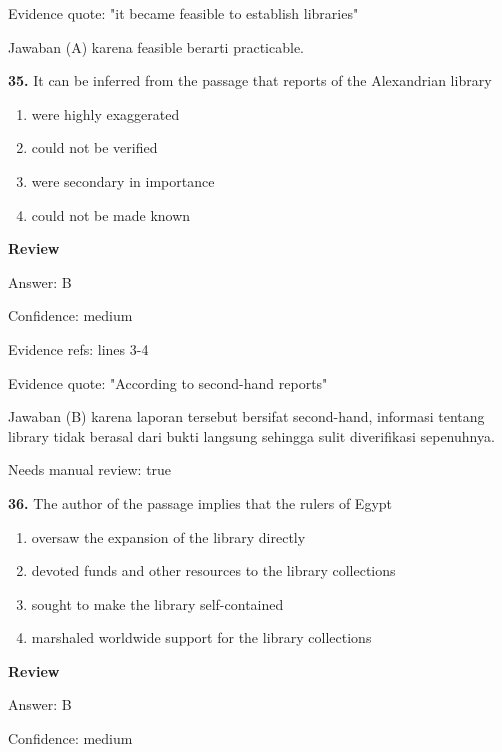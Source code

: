 \documentclass[12pt]{article}
\begin{document}
Evidence quote: "it became feasible to establish libraries"\par
Jawaban (A) karena feasible berarti practicable.\par
\endgroup
\par
\vspace{0.25\baselineskip}
\noindent\textbf{35.} It can be inferred from the passage that reports of the Alexandrian library
\begin{enumerate}[label=(\Alph*),leftmargin=*,itemsep=0.2em]
\item were highly exaggerated
\item could not be verified
\item were secondary in importance
\item could not be made known
\end{enumerate}
\par
\begingroup
\setlength{\parskip}{0pt}
\setlength{\parindent}{0pt}
\textbf{Review}\par
Answer: B\par
Confidence: medium\par
Evidence refs: lines 3-4\par
Evidence quote: "According to second-hand reports"\par
Jawaban (B) karena laporan tersebut bersifat second-hand, informasi tentang library tidak berasal dari bukti langsung sehingga sulit diverifikasi sepenuhnya.\par
Needs manual review: true\par
\endgroup
\par
\vspace{0.25\baselineskip}
\noindent\textbf{36.} The author of the passage implies that the rulers of Egypt
\begin{enumerate}[label=(\Alph*),leftmargin=*,itemsep=0.2em]
\item oversaw the expansion of the library directly
\item devoted funds and other resources to the library collections
\item sought to make the library self-contained
\item marshaled worldwide support for the library collections
\end{enumerate}
\par
\begingroup
\setlength{\parskip}{0pt}
\setlength{\parindent}{0pt}
\textbf{Review}\par
Answer: B\par
Confidence: medium\par
\end{document}
